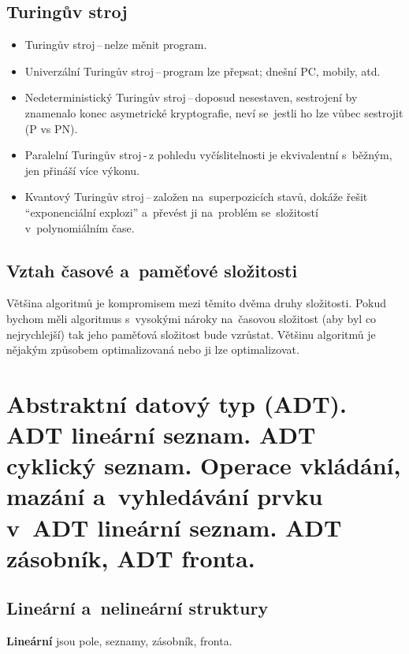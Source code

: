 \subsection{Turingův stroj}

\begin{itemize}
	\item Turingův stroj\,--\,nelze měnit program.
	\item Univerzální Turingův stroj\,--\,program lze přepsat; dnešní PC, mobily, atd.
	\item Nedeterministický Turingův stroj\,--\,doposud nesestaven, sestrojení by znamenalo konec asymetrické kryptografie, neví se~jestli ho lze vůbec sestrojit (P vs PN).
	\item Paralelní Turingův stroj\,-\,z pohledu vyčíslitelnosti je ekvivalentní s~běžným, jen přináší více výkonu.
	\item Kvantový Turingův stroj\,--\,založen na~superpozicích stavů, dokáže řešit \enquote{exponenciální explozi} a~převést ji na~problém se~složitostí v~polynomiálním čase.
\end{itemize}


\subsection{Vztah časové a~paměťové složitosti}

Většina algoritmů je kompromisem mezi těmito dvěma druhy složitosti. Pokud bychom měli algoritmus s~vysokými nároky na~časovou složitost (aby byl co nejrychlejší) tak jeho paměťová složitost bude vzrůstat. Většinu algoritmů je nějakým způsobem optimalizovaná nebo ji lze optimalizovat.

\clearpage
\section{Abstraktní datový typ (ADT). ADT lineární seznam. ADT cyklický seznam. Operace vkládání, mazání a~vyhledávání prvku v~ADT lineární seznam. ADT zásobník, ADT fronta.}


\subsection{Lineární a~nelineární struktury}

\textbf{Lineární} jsou pole, seznamy, zásobník, fronta.


